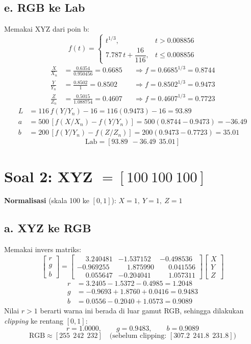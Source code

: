 \documentclass[11pt,a4paper]{article}
\begin{document}
\subsection*{e. RGB ke Lab}
Memakai XYZ dari poin b:
\[
f(t) =
\begin{cases}
t^{1/3}, & t > 0.008856\\[2pt]
7.787\,t + \dfrac{16}{116}, & t \le 0.008856
\end{cases}
\]
\begin{align*}
\frac{X}{X_n} &= \frac{0.6354}{0.950456} = 0.6685 &&\Rightarrow f = 0.6685^{1/3} = 0.8744\\
\frac{Y}{Y_n} &= \frac{0.8502}{1} = 0.8502 &&\Rightarrow f = 0.8502^{1/3} = 0.9473\\
\frac{Z}{Z_n} &= \frac{0.5015}{1.088754} = 0.4607 &&\Rightarrow f = 0.4607^{1/3} = 0.7723
\end{align*}
\begin{align*}
L &= 116\,f(Y/Y_n) - 16 = 116(0.9473) - 16 = 93.89\\
a &= 500\,[f(X/X_n) - f(Y/Y_n)] = 500(0.8744 - 0.9473) = -36.49\\
b &= 200\,[f(Y/Y_n) - f(Z/Z_n)] = 200(0.9473 - 0.7723) = 35.01
\end{align*}
\[
\boxed{\text{Lab} = [93.89\ \ -36.49\ \ 35.01]}
\]

\newpage
\section*{Soal 2: XYZ $= [100\ 100\ 100]$}

\textbf{Normalisasi} (skala 100 ke $[0,1]$): $X = 1,\ Y = 1,\ Z = 1$

\subsection*{a. XYZ ke RGB}
Memakai invers matriks:
\[
\begin{bmatrix} r \\ g \\ b \end{bmatrix} =
\begin{bmatrix}
\phantom{-}3.240481 & -1.537152 & -0.498536\\
-0.969255 & \phantom{-}1.875990 & \phantom{-}0.041556\\
\phantom{-}0.055647 & -0.204041 & \phantom{-}1.057311
\end{bmatrix}
\begin{bmatrix} X \\ Y \\ Z \end{bmatrix}
\]
\begin{align*}
r &= 3.2405 - 1.5372 - 0.4985 = 1.2048\\
g &= -0.9693 + 1.8760 + 0.0416 = 0.9483\\
b &= 0.0556 - 0.2040 + 1.0573 = 0.9089
\end{align*}
Nilai $r > 1$ berarti warna ini berada di luar gamut RGB, sehingga dilakukan \textit{clipping} ke rentang $[0,1]$:
\[
r = 1.0000,\qquad g = 0.9483,\qquad b = 0.9089
\]
\[
\boxed{\text{RGB} \approx [255\ \ 242\ \ 232]}\quad\text{(sebelum clipping: } [307.2\ \ 241.8\ \ 231.8])
\]
\end{document}
